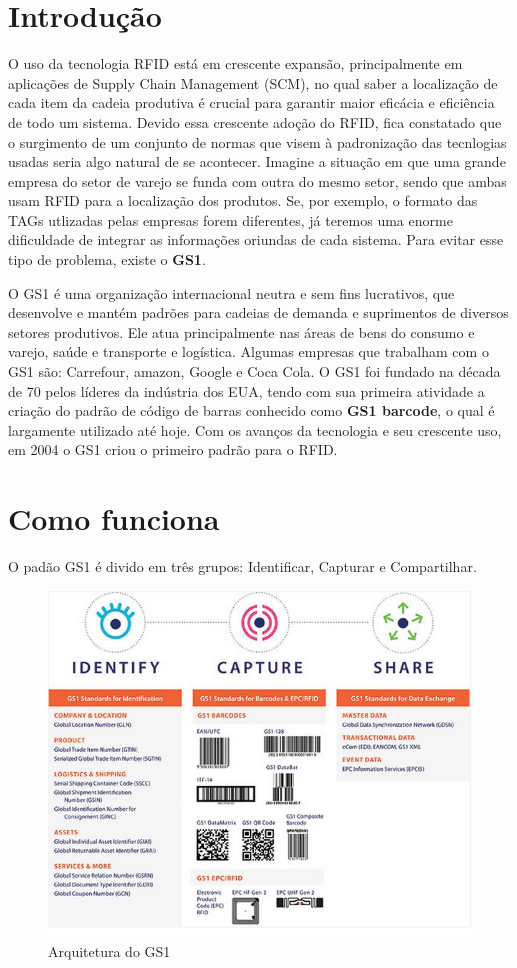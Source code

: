 \documentclass[a4paper,12pt,titlepage]{article}
\begin{document}
\section{Introdução}	
	O uso da tecnologia RFID está em crescente expansão, principalmente em aplicações de Supply Chain Management (SCM), no qual saber a localização de cada item da cadeia produtiva é crucial para garantir maior eficácia e eficiência de todo um sistema. Devido essa crescente adoção do RFID, fica constatado que o surgimento de um conjunto de normas que visem à padronização das tecnlogias usadas seria algo natural de se acontecer. Imagine a situação em que uma grande empresa do setor de varejo se funda com outra do mesmo setor, sendo que ambas usam RFID para a localização dos produtos. Se, por exemplo, o formato das TAGs utlizadas pelas empresas forem diferentes, já teremos uma enorme dificuldade de integrar as informações oriundas de cada sistema. Para evitar esse tipo de problema, existe o \textbf{GS1}.
	
	O GS1 é uma organização internacional neutra e sem fins lucrativos, que desenvolve e mantém padrões para cadeias de demanda e suprimentos de diversos setores produtivos. Ele atua principalmente nas áreas de bens do consumo e varejo, saúde e transporte e logística. Algumas empresas que trabalham com o GS1 são: Carrefour, amazon, Google e Coca Cola. 	
	O GS1 foi fundado na década de 70 pelos líderes da indústria dos EUA, tendo com sua primeira atividade a criação do padrão de código de barras conhecido como \textbf{GS1 barcode}, o qual é largamente utilizado até hoje. Com os avanços da tecnologia e seu crescente uso, em 2004 o GS1 criou o primeiro padrão para o RFID.

\section{Como funciona}
	O padão GS1 é divido em três grupos: Identificar, Capturar e Compartilhar. 
	\begin{figure}[h!]
		\centering
		\includegraphics[width=0.7\linewidth]{gs1arch}
		\caption{Arquitetura do GS1}
		\label{fig:gs1arch}
	\end{figure}
\end{document}
